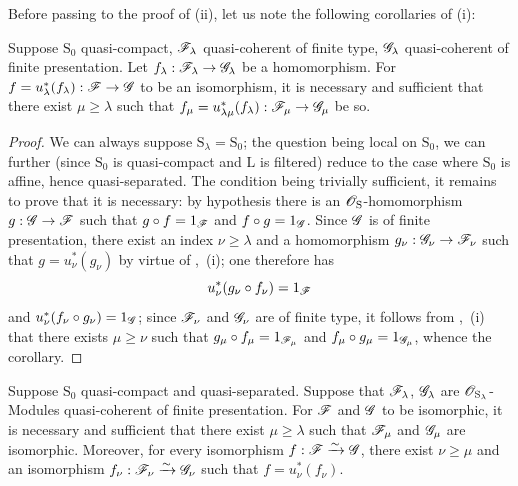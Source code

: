 Before passing to the proof of (ii), let us note the following corollaries of (i):

\begin{corollary}[8.5.2.4]
\label{IV.8.5.2.4}
Suppose $\mathrm{S}_0$ quasi-compact, $\mathscr{F}_\lambda$ quasi-coherent of finite type, $\mathscr{G}_\lambda$ quasi-coherent of finite presentation.
Let $f_\lambda:\mathscr{F}_\lambda\to\mathscr{G}_\lambda$ be a homomorphism.
For $f=u_\lambda^*(f_\lambda):\mathscr{F}\to\mathscr{G}$ to be an isomorphism, it is necessary and sufficient that there exist $\mu\geqslant\lambda$ such that $f_\mu=u_{\lambda\mu}^*(f_\lambda):\mathscr{F}_\mu\to\mathscr{G}_\mu$ be so.
\end{corollary}

\begin{proof}
We can always suppose $\mathrm{S}_\lambda=\mathrm{S}_0$; the question being local on $\mathrm{S}_0$, we can further (since $\mathrm{S}_0$ is quasi-compact and $\mathrm{L}$ is filtered) reduce to the case where $\mathrm{S}_0$ is affine, hence quasi-separated.
The condition being trivially sufficient, it remains to prove that it is necessary: by hypothesis there is an $\mathscr{O}_\mathrm{S}$-homomorphism $g:\mathscr{G}\to\mathscr{F}$ such that $g\circ f=1_{\mathscr{F}}$ and $f\circ g=1_{\mathscr{G}}$.
Since $\mathscr{G}$ is of finite presentation, there exist an index $\nu\geqslant\lambda$ and a homomorphism $g_\nu:\mathscr{G}_\nu\to\mathscr{F}_\nu$ such that $g=u_\nu^*(g_\nu)$ by virtue of ,~(i); one therefore has
\[
  u_\nu^*(g_\nu\circ f_\nu)=1_{\mathscr{F}}
\]
and $u_\nu^*(f_\nu\circ g_\nu)=1_{\mathscr{G}}$; since $\mathscr{F}_\nu$ and $\mathscr{G}_\nu$ are of finite type, it follows from ,~(i) that there exists $\mu\geqslant\nu$ such that $g_\mu\circ f_\mu=1_{\mathscr{F}_\mu}$ and $f_\mu\circ g_\mu=1_{\mathscr{G}_\mu}$, whence the corollary.
\end{proof}

\begin{corollary}[8.5.2.5]
\label{IV.8.5.2.5}
Suppose $\mathrm{S}_0$ quasi-compact and quasi-separated.
Suppose that $\mathscr{F}_\lambda$, $\mathscr{G}_\lambda$ are $\mathscr{O}_{\mathrm{S}_\lambda}$-Modules quasi-coherent of finite presentation.
For $\mathscr{F}$ and $\mathscr{G}$ to be isomorphic, it is necessary and sufficient that there exist $\mu\geqslant\lambda$ such that $\mathscr{F}_\mu$ and $\mathscr{G}_\mu$ are isomorphic.
Moreover, for every isomorphism $f:\mathscr{F}\xrightarrow{\sim}\mathscr{G}$, there exist $\nu\geqslant\mu$ and an isomorphism $f_\nu:\mathscr{F}_\nu\xrightarrow{\sim}\mathscr{G}_\nu$ such that $f=u_\nu^*(f_\nu)$.
\end{corollary}

